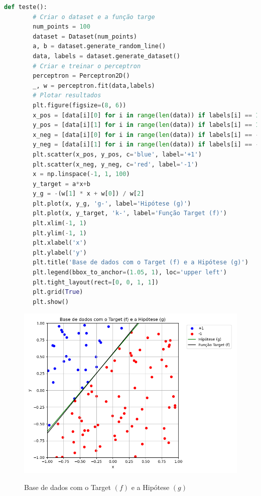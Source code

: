 \begin{lstlisting}[language=Python, caption=Teste das classes, label=cod:perceptron_teste]
    def teste():
        # Criar o dataset e a função targe
        num_points = 100
        dataset = Dataset(num_points)
        a, b = dataset.generate_random_line()
        data, labels = dataset.generate_dataset()
        # Criar e treinar o perceptron
        perceptron = Perceptron2D()
        _, w = perceptron.fit(data,labels)
        # Plotar resultados
        plt.figure(figsize=(8, 6))
        x_pos = [data[i][0] for i in range(len(data)) if labels[i] == 1]
        y_pos = [data[i][1] for i in range(len(data)) if labels[i] == 1]
        x_neg = [data[i][0] for i in range(len(data)) if labels[i] == -1]
        y_neg = [data[i][1] for i in range(len(data)) if labels[i] == -1]
        plt.scatter(x_pos, y_pos, c='blue', label='+1')
        plt.scatter(x_neg, y_neg, c='red', label='-1')
        x = np.linspace(-1, 1, 100)
        y_target = a*x+b
        y_g = -(w[1] * x + w[0]) / w[2]
        plt.plot(x, y_g, 'g-', label='Hipótese (g)')
        plt.plot(x, y_target, 'k-', label='Função Target (f)')
        plt.xlim(-1, 1)
        plt.ylim(-1, 1)
        plt.xlabel('x')
        plt.ylabel('y')
        plt.title('Base de dados com o Target (f) e a Hipótese (g)')
        plt.legend(bbox_to_anchor=(1.05, 1), loc='upper left')
        plt.tight_layout(rect=[0, 0, 1, 1])
        plt.grid(True)
        plt.show()
\end{lstlisting}

\begin{figure}[H]
    \caption{Base de dados com o Target $(f)$ e a Hipótese $(g)$}
       \centering
       \includegraphics[width=\textwidth]{perceptron_plot.png}
    \label{fig:perceptron_plot}
\end{figure}



